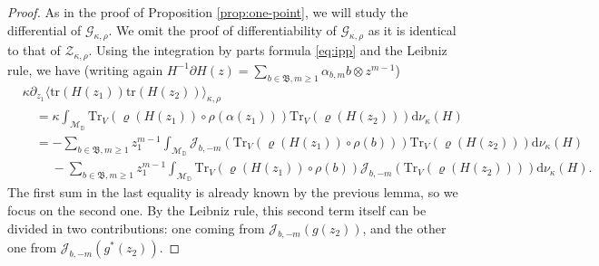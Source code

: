 \documentclass[12pt,a4paper]{amsart}
\numberwithin{equation}{section}
\theoremstyle{remark}
\theoremstyle{definition}
\newcommand{\D}{\mathbb D}
\renewcommand{\d}{\mathrm d}
\newcommand{\kB}{\mathfrak B}
\newcommand{\del}{\partial}
\newcommand{\cJ}{\mathcal J}
\newcommand{\cM}{\mathcal M}
\newcommand{\tr}{\mathrm{tr}}
\newcommand{\cG}{\mathcal{G}}
\newcommand{\cZ}{\mathcal{Z}}
\begin{document}
\begin{proof}
    As in the proof of Proposition \ref{prop:one-point}, we will study the differential of $\cG_{\kappa,\rho}$. We omit the proof of differentiability of $\cG_{\kappa,\rho}$ as it is identical to that of $\cZ_{\kappa,\rho}$. Using the integration by parts formula \eqref{eq:ipp} and the Leibniz rule, we have (writing again $H^{-1}\del H(z)=\sum_{b\in\kB,m\geq1}\alpha_{b,m}b\otimes z^{m-1}$)
    \begin{equation}\label{eq:two-point-start}
    \begin{aligned}
    &\kappa\del_{z_1}\langle \tr(H(z_1))\tr(H(z_2))\rangle_{\kappa,\rho}\\
&\quad=\kappa\int_{\cM_\D}\mathrm{Tr}_V(\varrho(H(z_1))\circ\rho(\alpha(z_1)))\mathrm{Tr}_V(\varrho(H(z_2)))\d\nu_\kappa(H)\\
&\quad=-\sum_{b\in\kB,m\geq1}z_1^{m-1}\int_{\cM_\D}\cJ_{b,-m}\left(\mathrm{Tr}_V(\varrho(H(z_1))\circ\rho(b))\right)\mathrm{Tr}_V(\varrho(H(z_2)))\d\nu_\kappa(H)\\
&\qquad\;-\sum_{b\in\kB,m\geq1}z_1^{m-1}\int_{\cM_\D}\mathrm{Tr}_V(\varrho(H(z_1))\circ\rho(b))\cJ_{b,-m}\left(\mathrm{Tr}_V(\varrho(H(z_2)))\right)\d\nu_\kappa(H).
    \end{aligned}
    \end{equation}
The first sum in the last equality is already known by the previous lemma, so we focus on the second one. By the Leibniz rule, this second term itself can be divided in two contributions: one coming from $\cJ_{b,-m}(g(z_2))$, and the other one from $\cJ_{b,-m}(g^*(z_2))$. %





\end{proof}
\end{document}
